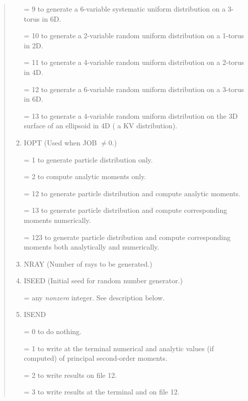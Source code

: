 \begin{quotation}
\begin{enumerate}
       = 9 to generate a 6-variable systematic uniform distribution on a
3-torus in \hspace*{1em}6D.

       = 10 to generate a 2-variable random uniform distribution on a
1-torus in \hspace*{1em}2D.

       = 11 to generate a 4-variable random uniform distribution on a
2-torus in \hspace*{1em}4D.

       = 12 to generate a 6-variable random uniform distribution on a
3-torus in \hspace*{1em}6D.

       = 13 to generate a 4-variable random uniform distribution on the 3D
surface \hspace*{1em}of an  ellipsoid in 4D ( a KV distribution).

\item   IOPT (Used when JOB $\neq 0$.)

       = 1 to generate particle distribution only.

       = 2 to compute analytic moments only.

       = 12 to generate particle distribution and compute analytic moments.

       = 13 to generate particle distribution and compute corresponding
moments \hspace*{1em}numerically.

       = 123 to generate particle distribution and compute corresponding
moments \hspace*{1em}both analytically and numerically.

\item   NRAY (Number of rays to be generated.)

\item  ISEED (Initial seed for random number generator.)

       = any {\em nonzero} integer.  See description below.

\item  ISEND

      = 0 to do nothing.

      = 1 to write at the terminal numerical and analytic values (if computed) \hspace*{1em}of
        principal second-order moments.

      = 2 to write results on file 12.

      = 3 to write results at the terminal and on file 12.


\end{enumerate}
\end{quotation}
